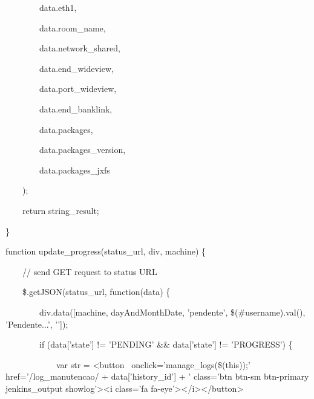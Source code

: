 {\ttfamily\color[rgb]{0.10980392,0.10980392,0.10980392}
    \ \ \ \ \ \ \ \ data.eth1,}

{\ttfamily\color[rgb]{0.10980392,0.10980392,0.10980392}
    \ \ \ \ \ \ \ \ data.room\_name,}

{\ttfamily\color[rgb]{0.10980392,0.10980392,0.10980392}
    \ \ \ \ \ \ \ \ data.network\_shared,}

{\ttfamily\color[rgb]{0.10980392,0.10980392,0.10980392}
    \ \ \ \ \ \ \ \ data.end\_wideview,}

{\ttfamily\color[rgb]{0.10980392,0.10980392,0.10980392}
    \ \ \ \ \ \ \ \ data.port\_wideview,}

{\ttfamily\color[rgb]{0.10980392,0.10980392,0.10980392}
    \ \ \ \ \ \ \ \ data.end\_banklink,}

{\ttfamily\color[rgb]{0.10980392,0.10980392,0.10980392}
    \ \ \ \ \ \ \ \ data.packages,}

{\ttfamily\color[rgb]{0.10980392,0.10980392,0.10980392}
    \ \ \ \ \ \ \ \ data.packages\_version,}

{\ttfamily\color[rgb]{0.10980392,0.10980392,0.10980392}
    \ \ \ \ \ \ \ \ data.packages\_jxfs}

{\ttfamily\color[rgb]{0.10980392,0.10980392,0.10980392}
    \ \ \ \ );}

{\ttfamily\color[rgb]{0.10980392,0.10980392,0.10980392}
    \ \ \ \ return string\_result;}

{\ttfamily\color[rgb]{0.10980392,0.10980392,0.10980392}
    \}}


    \bigskip

{\ttfamily\color[rgb]{0.10980392,0.10980392,0.10980392}
    function update\_progress(status\_url, div, machine) \{}

{\ttfamily\color[rgb]{0.10980392,0.10980392,0.10980392}
    \ \ \ \ // send GET request to status URL}

{\ttfamily\color[rgb]{0.10980392,0.10980392,0.10980392}
    \ \ \ \ \$.getJSON(status\_url, function(data) \{}

            {\ttfamily\color[rgb]{0.10980392,0.10980392,0.10980392}
            \ \ \ \ \ \ \ \ div.data([machine, dayAndMonthDate, 'pendente', \$({\textquotedbl}\#username{\textquotedbl}).val(),
                    'Pendente...', '{}']);}

            {\ttfamily\color[rgb]{0.10980392,0.10980392,0.10980392}
            \ \ \ \ \ \ \ \ if (data['state'] != 'PENDING' \&\& data['state'] != 'PROGRESS') \{}

            {\ttfamily\color[rgb]{0.10980392,0.10980392,0.10980392}
            \ \ \ \ \ \ \ \ \ \ \ \ var str = {\textquotedbl}{\textless}button \ onclick='manage\_logs(\$(this));'
            href='/log\_manutencao/{\textquotedbl} + data['history\_id'] + {\textquotedbl}' class='btn btn-sm btn-primary
            jenkins\_output showlog'{\textgreater}{\textless}i class='fa
            fa-eye'{\textgreater}{\textless}/i{\textgreater}{\textless}/button{\textgreater}{\textquotedbl}}


